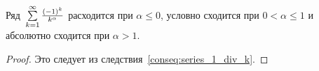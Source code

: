\begin{consequent}
Ряд~$\series \frac{(-1)^k}{k^\alpha}$ расходится при $\alpha \leqslant 0$, условно сходится при $0 < \alpha \leqslant 1$ и абсолютно сходится при $\alpha > 1$.
\end{consequent}
\begin{proof}
Это следует из следствия~\ref{conseq:series_1_div_k}.
\end{proof}